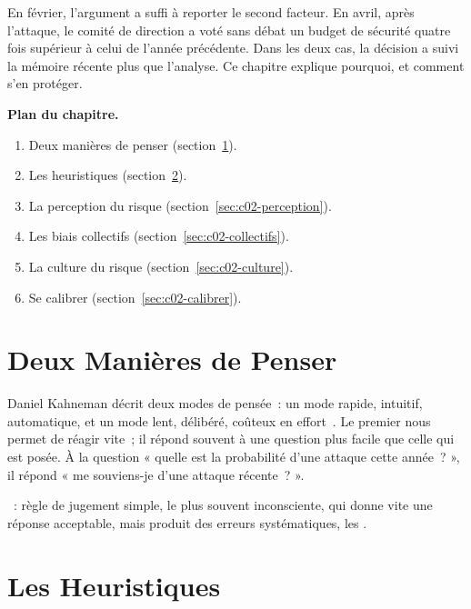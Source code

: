 En février, l'argument a suffi à reporter le second facteur. En avril,
après l'attaque, le comité de direction a voté sans débat un budget de
sécurité quatre fois supérieur à celui de l'année précédente. Dans les
deux cas, la décision a suivi la mémoire récente plus que l'analyse. Ce
chapitre explique pourquoi, et comment s'en protéger.

\medskip
\textbf{Plan du chapitre.}
\begin{enumerate}
    \item Deux manières de penser (section~\ref{sec:c02-systemes}).
    \item Les heuristiques (section~\ref{sec:c02-heuristiques}).
    \item La perception du risque (section~\ref{sec:c02-perception}).
    \item Les biais collectifs (section~\ref{sec:c02-collectifs}).
    \item La culture du risque (section~\ref{sec:c02-culture}).
    \item Se calibrer (section~\ref{sec:c02-calibrer}).
\end{enumerate}

\separateur

\section{Deux Manières de Penser}
\label{sec:c02-systemes}

Daniel Kahneman décrit deux modes de pensée~: un mode rapide, intuitif,
automatique, et un mode lent, délibéré, coûteux en
effort~\cite{kahneman2011}. Le premier nous permet de réagir vite~; il
répond souvent à une question plus facile que celle qui est posée. À la
question « quelle est la probabilité d'une attaque cette année~? », il
répond « me souviens-je d'une attaque récente~? ».

\begin{boxdef}
~: règle de jugement simple, le plus souvent
inconsciente, qui donne vite une réponse acceptable, mais produit des
erreurs systématiques, les .
\end{boxdef}

\section{Les Heuristiques}
\label{sec:c02-heuristiques}

